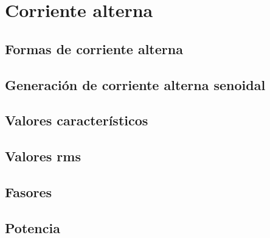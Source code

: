 \chapter{Corriente alterna}

\section{Formas de corriente alterna}

\section{Generación de corriente alterna senoidal}

\section{Valores característicos}

\section{Valores rms}

\section{Fasores}

\section{Potencia}
